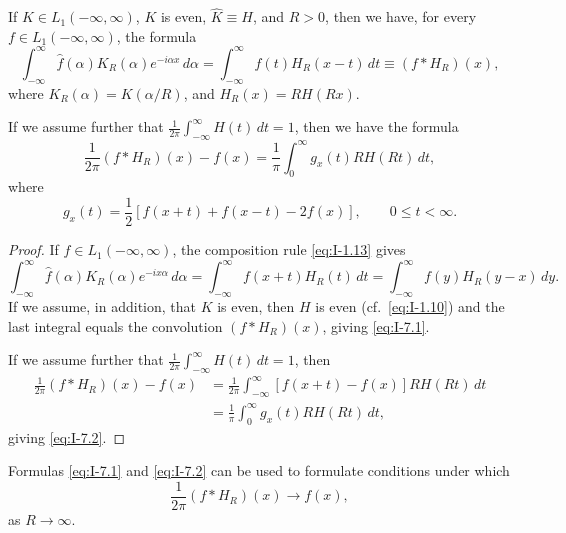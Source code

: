 \begin{theorem}\label{thm:I-8}
If $K\in L_1(-\infty,\infty)$, $K$ is even, $\hat K\equiv H$, and $R>0$, then we have, for every $f\in L_1(-\infty,\infty)$, the formula
\begin{equation}\label{eq:I-7.1}
\int_{-\infty}^{\infty}\hat f(\alpha)K_R(\alpha)e^{-i\alpha x}\,d\alpha
=\int_{-\infty}^{\infty}f(t)H_R(x-t)\,dt
\equiv(f*H_R)(x),
\end{equation}
where $K_R(\alpha)=K(\alpha/R)$, and $H_R(x)=RH(Rx)$.

If we assume further that $\frac{1}{2\pi}\int_{-\infty}^{\infty}H(t)\,dt=1$, then we have the formula
\begin{equation}\label{eq:I-7.2}
\frac{1}{2\pi}(f*H_R)(x)-f(x)
=\frac{1}{\pi}\int_0^\infty g_x(t)RH(Rt)\,dt,
\end{equation}
where
\begin{equation}\label{eq:I-7.3}
g_x(t)=\frac12[f(x+t)+f(x-t)-2f(x)],\qquad 0\le t<\infty.
\end{equation}
\end{theorem}

\begin{proof}
If $f\in L_1(-\infty,\infty)$, the composition rule \eqref{eq:I-1.13} gives
\begin{equation}\label{eq:I-7.4}
\int_{-\infty}^{\infty}\hat f(\alpha)K_R(\alpha)e^{-ix\alpha}\,d\alpha
=\int_{-\infty}^{\infty}f(x+t)H_R(t)\,dt
=\int_{-\infty}^{\infty}f(y)H_R(y-x)\,dy.
\end{equation}
If we assume, in addition, that $K$ is even, then $H$ is even (cf.\ \eqref{eq:I-1.10}) and the last integral equals the convolution $(f*H_R)(x)$, giving \eqref{eq:I-7.1}.

If we assume further that $\frac{1}{2\pi}\int_{-\infty}^{\infty}H(t)\,dt=1$, then
\begin{equation*}
\begin{aligned}
\frac{1}{2\pi}(f*H_R)(x)-f(x) &= \frac{1}{2\pi}\int_{-\infty}^{\infty}[f(x+t)-f(x)]RH(Rt)\,dt\\
&= \frac{1}{\pi}\int_0^\infty g_x(t)RH(Rt)\,dt,
\end{aligned}
\end{equation*}
giving \eqref{eq:I-7.2}.
\end{proof}

Formulas \eqref{eq:I-7.1} and \eqref{eq:I-7.2} can be used to formulate conditions under which
\begin{equation*}
\frac{1}{2\pi}(f*H_R)(x)\to f(x),
\end{equation*}
as $R\to\infty$.

